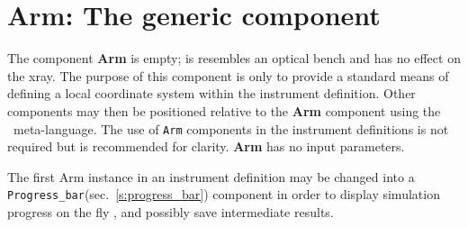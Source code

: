 \section{Arm: The generic component}
\label{s:arm}

The component \textbf{Arm} is empty; is resembles an optical bench
and has no effect on the xray.
The purpose of this component is only to provide a standard
means of defining a local coordinate system within the instrument definition.
Other components may then be
positioned relative to the \textbf{Arm} component
using the \MCX\ meta-language.
The use of \texttt{Arm} components in the instrument definitions
is not required but is recommended for clarity.
\textbf{Arm} has no input parameters.

The first Arm instance in an instrument definition may be changed into a
\verb+Progress_bar+(sec.~\ref{s:progress_bar}) component in order to display
simulation progress on the fly , and possibly save intermediate results.

